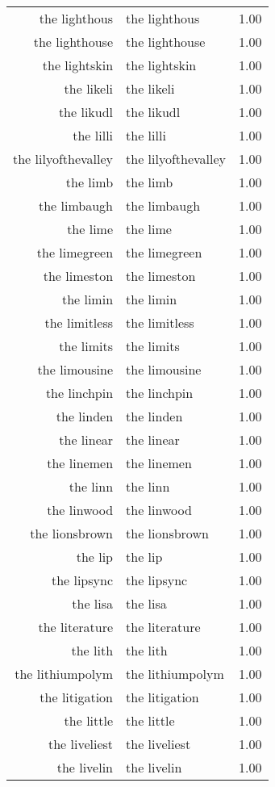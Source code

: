 \begin{table}[ht]
\begin{tabular}{rlr}
  the lighthous & the lighthous & 1.00 \\ 
  the lighthouse & the lighthouse & 1.00 \\ 
  the lightskin & the lightskin & 1.00 \\ 
  the likeli & the likeli & 1.00 \\ 
  the likudl & the likudl & 1.00 \\ 
  the lilli & the lilli & 1.00 \\ 
  the lilyofthevalley & the lilyofthevalley & 1.00 \\ 
  the limb & the limb & 1.00 \\ 
  the limbaugh & the limbaugh & 1.00 \\ 
  the lime & the lime & 1.00 \\ 
  the limegreen & the limegreen & 1.00 \\ 
  the limeston & the limeston & 1.00 \\ 
  the limin & the limin & 1.00 \\ 
  the limitless & the limitless & 1.00 \\ 
  the limits & the limits & 1.00 \\ 
  the limousine & the limousine & 1.00 \\ 
  the linchpin & the linchpin & 1.00 \\ 
  the linden & the linden & 1.00 \\ 
  the linear & the linear & 1.00 \\ 
  the linemen & the linemen & 1.00 \\ 
  the linn & the linn & 1.00 \\ 
  the linwood & the linwood & 1.00 \\ 
  the lionsbrown & the lionsbrown & 1.00 \\ 
  the lip & the lip & 1.00 \\ 
  the lipsync & the lipsync & 1.00 \\ 
  the lisa & the lisa & 1.00 \\ 
  the literature & the literature & 1.00 \\ 
  the lith & the lith & 1.00 \\ 
  the lithiumpolym & the lithiumpolym & 1.00 \\ 
  the litigation & the litigation & 1.00 \\ 
  the little & the little & 1.00 \\ 
  the liveliest & the liveliest & 1.00 \\ 
  the livelin & the livelin & 1.00 \\ 

\end{tabular}
\end{table}
